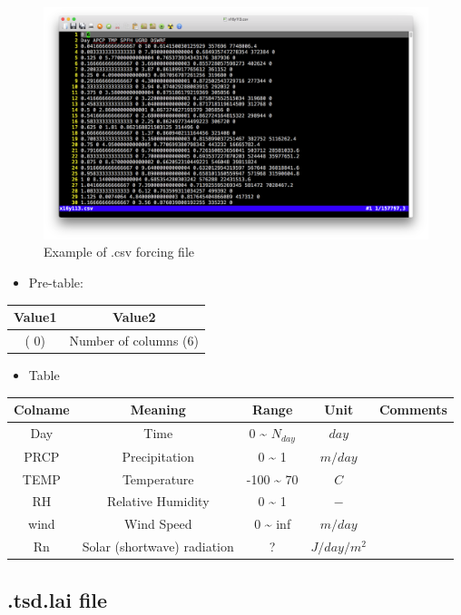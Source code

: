 \documentclass[]{scrbook}
\providecommand{\tightlist}{%
  \setlength{\itemsep}{0pt}\setlength{\parskip}{0pt}}
\begin{document}
\begin{figure}
\centering
\includegraphics{Fig/IO/tsd.csv.png}
\caption{Example of .csv forcing file}
\end{figure}

\begin{itemize}
\tightlist
\item
  Pre-table:
\end{itemize}

\begin{longtable}[]{@{}cc@{}}
\toprule
Value1 & Value2\tabularnewline
\midrule
\endhead
( \(0\)) & Number of columns (\(6\))\tabularnewline
\bottomrule
\end{longtable}

\begin{itemize}
\tightlist
\item
  Table
\end{itemize}

\begin{longtable}[]{@{}ccccc@{}}
\toprule
Colname & Meaning & Range & Unit & Comments\tabularnewline
\midrule
\endhead
Day & Time & 0 \textasciitilde{} \(N_{day}\) & \(day\) &\tabularnewline
PRCP & Precipitation & 0 \textasciitilde{} 1 & \(m/day\)
&\tabularnewline
TEMP & Temperature & -100 \textasciitilde{} 70 & \(C\) &\tabularnewline
RH & Relative Humidity & 0 \textasciitilde{} 1 & \(-\) &\tabularnewline
wind & Wind Speed & 0 \textasciitilde{} inf & \(m/day\) &\tabularnewline
Rn & Solar (shortwave) radiation & ? & \(J/day/m^2\) &\tabularnewline
\bottomrule
\end{longtable}

\subsection{.tsd.lai file}\label{tsd.lai-file}
\end{document}
